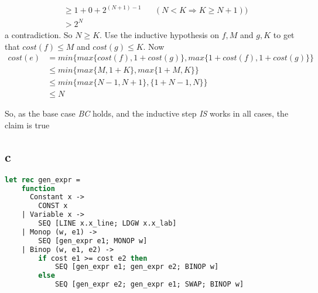 {{\begin{itemize}
\begin{align*}
                                      &\geq 1 + 0 + 2^{(N+1)-1} && (N < K \Rightarrow K \geq N+1))\\
                                      &> 2^N \end{align*}
                a contradiction.  So $N \geq K$. Use the inductive hypothesis on $f, M$ and $g, K$ to get that $cost(f) \leq M$ and $cost(g) \leq K$. Now
                \begin{align*} cost(e) &= min \{ max \{ cost(f), 1 + cost(g) \}, max \{ 1 + cost(f), 1 + cost(g) \} \}\\
                                       &\leq min \{ max \{ M, 1 + K \}, max \{ 1+M, K \} \}\\
                                       &\leq min \{ max \{ N-1, N+1 \}, \{ 1 + N-1, N \} \}\\
                &\leq N \end{align*}
        \end{itemize}
    }
    So, as the base case \textit{BC} holds, and the inductive step \textit{IS} works in all cases, the claim is true
}

\newpage
\subsection{c}

\begin{lstlisting}[language=ML]
let rec gen_expr =
    function
      Constant x ->
        CONST x
    | Variable x ->
        SEQ [LINE x.x_line; LDGW x.x_lab]
    | Monop (w, e1) ->
        SEQ [gen_expr e1; MONOP w]
    | Binop (w, e1, e2) ->
        if cost e1 >= cost e2 then
            SEQ [gen_expr e1; gen_expr e2; BINOP w]
        else
            SEQ [gen_expr e2; gen_expr e1; SWAP; BINOP w]
\end{lstlisting}
